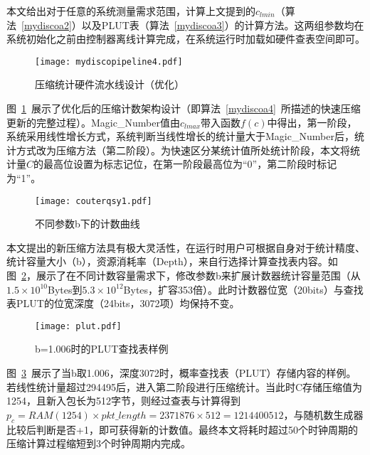 本文给出对于任意的系统测量需求范围，计算上文提到的$ c_{lmin} $（算法~\ref{mydiscoa2}）以及PLUT表（算法~\ref{mydiscoa3}）的计算方法。这两组参数均在系统初始化之前由控制器离线计算完成，在系统运行时加载如硬件查表空间即可。



\begin{figure}[!ht]
	\centering 
	\vspace{-1.5mm}
	\texttt{[image: mydiscopipeline4.pdf]}
	\caption{压缩统计硬件流水线设计（优化）} \label{fig:mydiscopipeline}
\end{figure}

图~\ref{fig:mydiscopipeline}~展示了优化后的压缩计数架构设计（即算法~\ref{mydiscoa4}~所描述的快速压缩更新的完整过程）。Magic\_Number值由$c_{lmax}$带入函数$f(c)$中得出，第一阶段，系统采用线性增长方式，系统判断当线性增长的统计量大于Magic\_Number后，统计方式改为压缩方法（第二阶段）。为快速区分某统计值所处统计阶段，本文将统计量$ C $的最高位设置为标志记位，在第一阶段最高位为“0”，第二阶段时标记为“1”。

\begin{figure}[!ht]
	\centering 
	\vspace{-1.5mm}
	\texttt{[image: couterqsy1.pdf]}
	\caption{不同参数b下的计数曲线} \label{fig:couterqsy1}
\end{figure}

本文提出的新压缩方法具有极大灵活性，在运行时用户可根据自身对于统计精度、统计容量大小（b），资源消耗率（Depth），来自行选择计算查找表内容。如图~\ref{fig:couterqsy1}，展示了在不同计数容量需求下，修改参数b来扩展计数器统计容量范围（从$1.5\times 10^{10}$Bytes到$5.3\times 10^{12}$Bytes，扩容353倍）。此时计数器位宽（20bits）与查找表PLUT的位宽深度（24bits，3072项）均保持不变。

\begin{figure}[!ht]
	\centering 
	\vspace{-1.5mm}
	\texttt{[image: plut.pdf]}
	\caption{b=1.006时的PLUT查找表样例} \label{fig:plut}
\end{figure}

图~\ref{fig:plut}~展示了当b取1.006，深度3072时，概率查找表（PLUT）存储内容的样例。若线性统计量超过294495后，进入第二阶段进行压缩统计。当此时C存储压缩值为1254，且新入包长为512字节，则经过查表与计算得到$ p_c=RAM(1254)\times pkt\_length= 2371876 \times 512 = 1214400512 $，与随机数生成器比较后判断是否+1，即可获得新的计数值。最终本文将耗时超过50个时钟周期的压缩计算过程缩短到3个时钟周期内完成。




